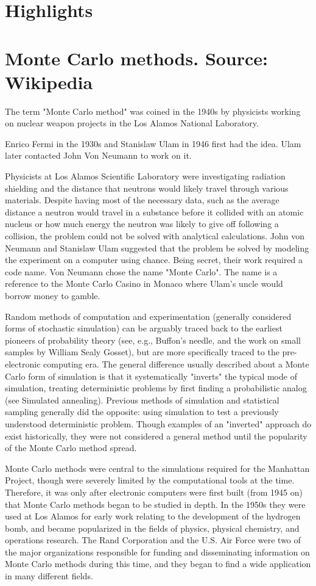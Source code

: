 \documentclass[english,graybox,envcountchap,envcountsame,sectrefs,shortlabels]{svmono}
\theoremstyle{style}
\begin{document}
\begin{subappendices}
\section*{Highlights}
\section{Monte Carlo methods. {\sf Source: Wikipedia}}
The term "Monte Carlo method" was coined in the 1940s by physicists working on nuclear weapon projects in the Los Alamos National Laboratory.

Enrico Fermi in the 1930s and Stanislaw Ulam in 1946 first had the idea. Ulam later contacted John Von Neumann to work on it.

Physicists at Los Alamos Scientific Laboratory were investigating radiation shielding and the distance that neutrons would likely travel through various materials. Despite having most of the necessary data, such as the average distance a neutron would travel in a substance before it collided with an atomic nucleus or how much energy the neutron was likely to give off following a collision, the problem could not be solved with analytical calculations. John von Neumann and Stanislaw Ulam suggested that the problem be solved by modeling the experiment on a computer using chance. Being secret, their work required a code name. Von Neumann chose the name "Monte Carlo". The name is a reference to the Monte Carlo Casino in Monaco where Ulam's uncle would borrow money to gamble.

Random methods of computation and experimentation (generally considered forms of stochastic simulation) can be arguably traced back to the earliest pioneers of probability theory (see, e.g., Buffon's needle, and the work on small samples by William Sealy Gosset), but are more specifically traced to the pre-electronic computing era. The general difference usually described about a Monte Carlo form of simulation is that it systematically "inverts" the typical mode of simulation, treating deterministic problems by first finding a probabilistic analog (see Simulated annealing). Previous methods of simulation and statistical sampling generally did the opposite: using simulation to test a previously understood deterministic problem. Though examples of an "inverted" approach do exist historically, they were not considered a general method until the popularity of the Monte Carlo method spread.

Monte Carlo methods were central to the simulations required for the Manhattan Project, though were severely limited by the computational tools at the time. Therefore, it was only after electronic computers were first built (from 1945 on) that Monte Carlo methods began to be studied in depth. In the 1950s they were used at Los Alamos for early work relating to the development of the hydrogen bomb, and became popularized in the fields of physics, physical chemistry, and operations research. The Rand Corporation and the U.S. Air Force were two of the major organizations responsible for funding and disseminating information on Monte Carlo methods during this time, and they began to find a wide application in many different fields.


\end{subappendices}
\end{document}
